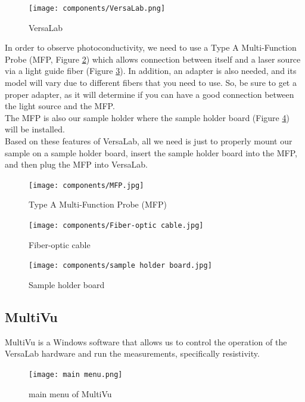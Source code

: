 \documentclass{article}
\begin{document}
        \begin{figure}[H]
        \centering
        \texttt{[image: components/VersaLab.png]}
        \caption{VersaLab}
        \label{Versalab}
        \end{figure}
        
        In order to observe photoconductivity, we need to use a Type A Multi-Function Probe (MFP, Figure \ref{MFP}) which allows connection between itself and a laser source via a light guide fiber (Figure \ref{fiber}). In addition, an adapter is also needed, and its model will vary due to different fibers that you need to use. So, be sure to get a proper adapter, as it will determine if you can have a good connection between the light source and the MFP.\\
        The MFP is also our sample holder where the sample holder board (Figure \ref{sample holder board}) will be installed.\\
        Based on these features of VersaLab, all we need is just to properly mount our sample on a sample holder board, insert the sample holder board into the MFP, and then plug the MFP into VersaLab.\\

        \begin{figure}[H]
        \centering
        \texttt{[image: components/MFP.jpg]}
        \caption{Type A Multi-Function Probe (MFP)}
        \label{MFP}
        \end{figure}
        
        \begin{figure}[H]
        \centering
        \texttt{[image: components/Fiber-optic cable.jpg]}
        \caption{Fiber-optic cable}
        \label{fiber}
        \end{figure}

        \begin{figure}[H]
        \centering
        \texttt{[image: components/sample holder board.jpg]}
        \caption{Sample holder board}
        \label{sample holder board}
        \end{figure}


    \subsection{MultiVu}
    
        MultiVu is a Windows software that allows us to control the operation of the VersaLab hardware and run the measurements, specifically resistivity.\\
        \begin{figure}[H]
            \centering
            \texttt{[image: main menu.png]}
            \caption{main menu of MultiVu}
            \label{main menu}
        \end{figure}
        
\end{document}
